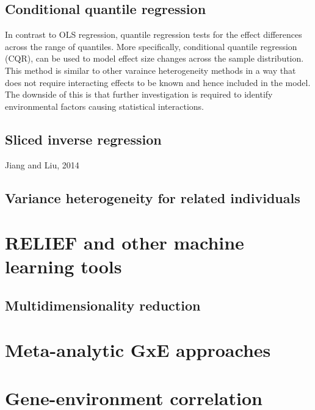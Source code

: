 \documentclass[]{book}
\theoremstyle{definition}
\theoremstyle{definition}
\theoremstyle{definition}
\theoremstyle{remark}
\begin{document}
\subsection{Conditional quantile
regression}\label{conditional-quantile-regression}

In contrast to OLS regression, quantile regression tests for the effect
differences across the range of quantiles. More specifically,
conditional quantile regression (CQR), can be used to model effect size
changes across the sample distribution. This method is similar to other
varaince heterogeneity methods in a way that does not require
interacting effects to be known and hence included in the model. The
downside of this is that further investigation is required to identify
environmental factors causing statistical interactions.

\subsection{Sliced inverse regression}\label{sliced-inverse-regression}

Jiang and Liu, 2014

\subsection{Variance heterogeneity for related
individuals}\label{variance-heterogeneity-for-related-individuals}

\section{RELIEF and other machine learning
tools}\label{relief-and-other-machine-learning-tools}

\subsection{Multidimensionality
reduction}\label{multidimensionality-reduction}

\section{Meta-analytic GxE
approaches}\label{meta-analytic-gxe-approaches}

\section{Gene-environment
correlation}\label{gene-environment-correlation}
\end{document}
